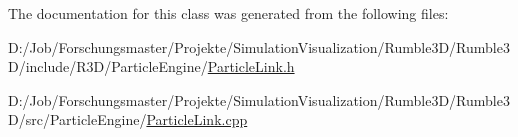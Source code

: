 The documentation for this class was generated from the following files\+:\begin{DoxyCompactItemize}
\item 
D\+:/\+Job/\+Forschungsmaster/\+Projekte/\+Simulation\+Visualization/\+Rumble3\+D/\+Rumble3\+D/include/\+R3\+D/\+Particle\+Engine/\mbox{\hyperlink{_particle_link_8h}{Particle\+Link.\+h}}\item 
D\+:/\+Job/\+Forschungsmaster/\+Projekte/\+Simulation\+Visualization/\+Rumble3\+D/\+Rumble3\+D/src/\+Particle\+Engine/\mbox{\hyperlink{_particle_link_8cpp}{Particle\+Link.\+cpp}}\end{DoxyCompactItemize}

